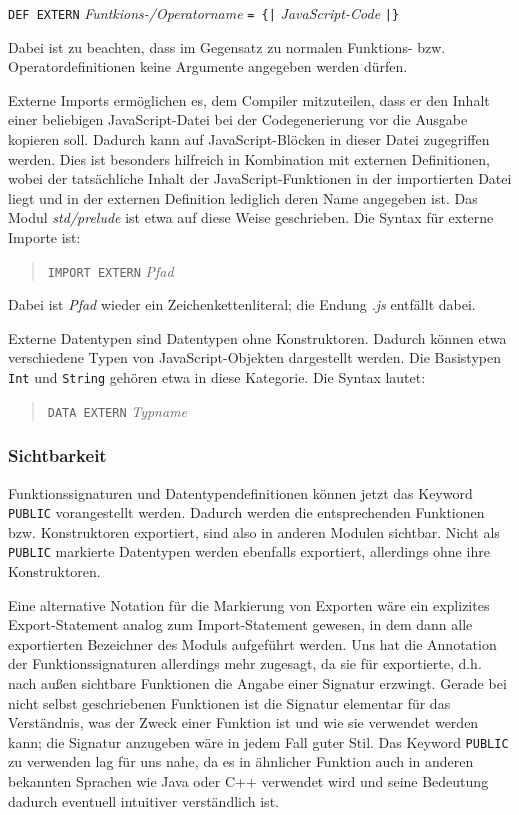 \documentclass[runningheads]{llncs}
\begin{document}
\verb|DEF EXTERN| \emph{Funtkions-/Operatorname} \verb:= {|:
\emph{JavaScript-Code} \verb:|}:

Dabei ist zu beachten, dass im Gegensatz zu normalen Funktions-
bzw. Operatordefinitionen keine Argumente angegeben werden dürfen.

Externe Imports ermöglichen es, dem Compiler mitzuteilen, dass er den
Inhalt einer beliebigen JavaScript-Datei bei der
Codegenerierung vor die Ausgabe kopieren soll. Dadurch kann auf
JavaScript-Blöcken in dieser Datei zugegriffen werden.
Dies ist besonders hilfreich in Kombination mit externen Definitionen,
wobei der tatsächliche Inhalt der JavaScript-Funktionen in der
importierten Datei liegt und in der externen Definition lediglich deren
Name angegeben ist.  Das Modul \emph{std/prelude} ist etwa auf diese
Weise geschrieben. Die Syntax für externe Importe ist:

\begin{quote}
\verb|IMPORT EXTERN| \emph{Pfad}
\end{quote}

Dabei ist \emph{Pfad} wieder ein Zeichenkettenliteral; die Endung
\emph{.js} entfällt dabei.

Externe Datentypen sind Datentypen ohne Konstruktoren. Dadurch können
etwa verschiedene Typen von JavaScript-Objekten dargestellt
werden.  Die Basistypen \verb|Int| und \verb|String| gehören etwa in
diese Kategorie.  Die Syntax lautet:

\begin{quote}
\verb|DATA EXTERN| \emph{Typname}
\end{quote}

\subsubsection{Sichtbarkeit}

Funktionssignaturen und Datentypendefinitionen können jetzt das Keyword
\verb|PUBLIC| vorangestellt werden.  Dadurch werden die entsprechenden
Funktionen bzw. Konstruktoren exportiert, sind also in anderen Modulen
sichtbar.  Nicht als \verb|PUBLIC| markierte Datentypen werden
ebenfalls exportiert, allerdings ohne ihre Konstruktoren.

Eine alternative Notation für die Markierung von Exporten wäre ein
explizites Export-Statement analog zum Import-Statement gewesen, in
dem dann alle exportierten Bezeichner des Moduls aufgeführt werden.
Uns hat die Annotation der Funktionssignaturen allerdings mehr
zugesagt, da sie für exportierte, d.h. nach außen sichtbare Funktionen
die Angabe einer Signatur erzwingt.  Gerade bei nicht selbst
geschriebenen Funktionen ist die Signatur elementar für das
Verständnis, was der Zweck einer Funktion ist und wie sie verwendet
werden kann; die Signatur anzugeben wäre in jedem Fall guter Stil.
Das Keyword \verb|PUBLIC| zu verwenden lag für uns nahe, da es in
ähnlicher Funktion auch in anderen bekannten Sprachen wie Java oder
C++ verwendet wird und seine Bedeutung dadurch eventuell intuitiver
verständlich ist.
\end{document}
